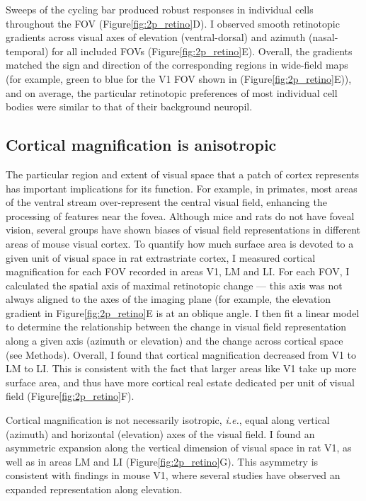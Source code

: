 Sweeps of the cycling bar produced robust responses in individual cells throughout the FOV (Figure\ref{fig:2p_retino}D). I observed smooth retinotopic gradients across visual axes of elevation (ventral-dorsal) and azimuth (nasal-temporal) for all included FOVs (Figure\ref{fig:2p_retino}E). Overall, the gradients matched the sign and direction of the corresponding regions in wide-field maps (for example, green to blue for the V1 FOV shown in (Figure\ref{fig:2p_retino}E)), and on average, the particular retinotopic preferences of most individual cell bodies were similar to that of their background neuropil.

\subsection{Cortical magnification is anisotropic}
The particular region and extent of visual space that a patch of cortex represents has important implications for its function. For example, in primates, most areas of the ventral stream over-represent the central visual field, enhancing the processing of features near the fovea\cite{Gattass2005CorticalDynamics}. Although mice and rats do not have foveal vision, several groups have shown biases of visual field representations in different areas of mouse visual cortex\cite{Garrett2014, Marshel2011, Sit2020}. To quantify how much surface area is devoted to a given unit of visual space in rat extrastriate cortex, I measured cortical magnification for each FOV recorded in areas V1, LM and LI. For each FOV, I calculated the spatial axis of maximal retinotopic change --- this axis was not always aligned to the axes of the imaging plane (for example, the elevation gradient in  Figure\ref{fig:2p_retino}E is at an oblique angle. I then fit a linear model to determine the relationship between the change in visual field representation along a given axis (azimuth or elevation) and the change across cortical space (see Methods). Overall, I found that cortical magnification decreased from V1 to LM to LI. This is consistent with the fact that larger areas like V1 take up more surface area, and thus have more cortical real estate dedicated per unit of visual field (Figure\ref{fig:2p_retino}F). 

Cortical magnification is not necessarily isotropic, \textit{i.e.}, equal along vertical (azimuth) and horizontal (elevation) axes of the visual field. I found an asymmetric expansion along the vertical dimension of visual space in rat V1, as well as in areas LM and LI (Figure\ref{fig:2p_retino}G). This asymmetry is consistent with findings in mouse V1, where several studies have observed an expanded representation along elevation\cite{Garrett2014, Liang2018, Bonin2011}.  
